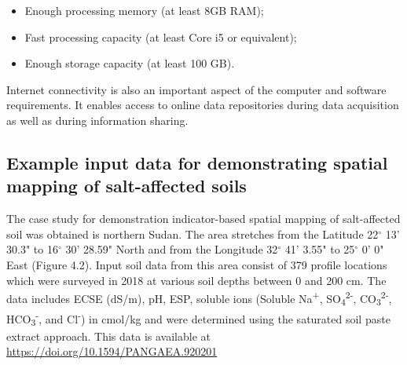 \documentclass[
  10pt,
  b5paper,
]{book}
\providecommand{\tightlist}{%
  \setlength{\itemsep}{0pt}\setlength{\parskip}{0pt}}
\begin{document}
\begin{itemize}
\tightlist
\item
  Enough processing memory (at least 8GB RAM);\\
\item
  Fast processing capacity (at least Core i5 or equivalent);\\
\item
  Enough storage capacity (at least 100 GB).
\end{itemize}

Internet connectivity is also an important aspect of the computer and software requirements. It enables access to online data repositories during data acquisition as well as during information sharing.

\hypertarget{example-input-data-for-demonstrating-spatial-mapping-of-salt-affected-soils}{%
\subsection{Example input data for demonstrating spatial mapping of salt-affected soils}\label{example-input-data-for-demonstrating-spatial-mapping-of-salt-affected-soils}}

The case study for demonstration indicator-based spatial mapping of salt-affected soil was obtained is northern Sudan. The area stretches from the Latitude 22\(^\circ\) 13' 30.3" to 16\(^\circ\) 30' 28.59" North and from the Longitude 32\(^\circ\) 41' 3.55" to 25\(^\circ\) 0' 0" East (Figure 4.2). Input soil data from this area consist of 379 profile locations which were surveyed in 2018 at various soil depths between 0 and 200 cm. The data includes
ECSE (dS/m), pH, ESP, soluble ions (Soluble Na\textsuperscript{+}, SO\textsubscript{4}\textsuperscript{2-}, CO\textsubscript{3}\textsuperscript{2-}, HCO\textsubscript{3}\textsuperscript{-}, and Cl\textsuperscript{-}) in cmol/kg and were determined using the saturated soil paste extract approach. This data is available at \url{https://doi.org/10.1594/PANGAEA.920201}
\end{document}
